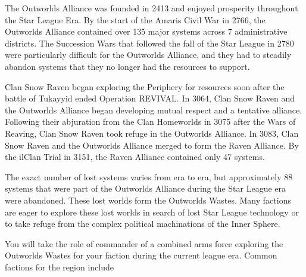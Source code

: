 The Outworlds Alliance was founded in 2413 and enjoyed prosperity throughout the Star League Era.
By the start of the Amaris Civil War in 2766, the Outworlds Alliance contained over 135 major systems across 7 administrative districts.
The Succession Wars that followed the fall of the Star League in 2780 were particularly difficult for the Outworlds Alliance, and they had to steadily abandon systems that they no longer had the resources to support.

Clan Snow Raven began exploring the Periphery for resources soon after the battle of Tukayyid ended Operation REVIVAL.
In 3064, Clan Snow Raven and the Outworlds Alliance began developing mutual respect and a tentative alliance.
Following their abjuration from the Clan Homeworlds in 3075 after the Wars of Reaving, Clan Snow Raven took refuge in the Outworlds Alliance.
In 3083, Clan Snow Raven and the Outworlds Alliance merged to form the Raven Alliance.
By the ilClan Trial in 3151, the Raven Alliance contained only 47 systems.

The exact number of lost systems varies from era to era, but approximately 88 systems that were part of the Outworlds Alliance during the Star League era were abandoned.
These lost worlds form the Outworlds Wastes.
Many factions are eager to explore these lost worlds in search of lost Star League technology or to take refuge from the complex political machinations of the Inner Sphere.

You will take the role of commander of a combined arms force exploring the Outworlds Wastes for your faction during the current league era.
Common factions for the region include
